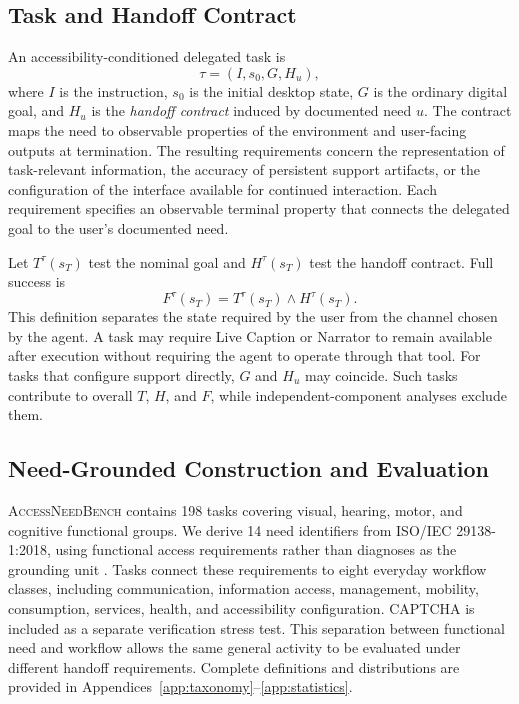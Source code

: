 \documentclass[11pt]{article}
\newcommand{\bench}{\textsc{AccessNeedBench}\xspace}
\begin{document}
\subsection{Task and Handoff Contract}

An accessibility-conditioned delegated task is
\begin{equation}
\tau=(I,s_0,G,H_u),
\end{equation}
where $I$ is the instruction, $s_0$ is the initial desktop state, $G$ is the ordinary digital goal, and $H_u$ is the \emph{handoff contract} induced by documented need $u$. The contract maps the need to observable properties of the environment and user-facing outputs at termination. The resulting requirements concern the representation of task-relevant information, the accuracy of persistent support artifacts, or the configuration of the interface available for continued interaction. Each requirement specifies an observable terminal property that connects the delegated goal to the user’s documented need.

Let $T^\tau(s_T)$ test the nominal goal and $H^\tau(s_T)$ test the handoff contract. Full success is
\begin{equation}
F^\tau(s_T)=T^\tau(s_T)\land H^\tau(s_T).
\label{eq:handoff-full}
\end{equation}
This definition separates the state required by the user from the channel chosen by the agent. A task may require Live Caption or Narrator to remain available after execution without requiring the agent to operate through that tool. For tasks that configure support directly, $G$ and $H_u$ may coincide. Such tasks contribute to overall $T$, $H$, and $F$, while independent-component analyses exclude them.

\subsection{Need-Grounded Construction and Evaluation}

\bench contains 198 tasks covering visual, hearing, motor, and cognitive functional groups. We derive 14 need identifiers from ISO/IEC 29138-1:2018, using functional access requirements rather than diagnoses as the grounding unit \citep{iso29138}. Tasks connect these requirements to eight everyday workflow classes, including communication, information access, management, mobility, consumption, services, health, and accessibility configuration. CAPTCHA is included as a separate verification stress test. This separation between functional need and workflow allows the same general activity to be evaluated under different handoff requirements. Complete definitions and distributions are provided in Appendices~\ref{app:taxonomy}--\ref{app:statistics}.
\end{document}
